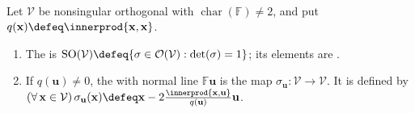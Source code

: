 \begin{definition} \label{def:orthogonal-symmetry-rotation-reflection} \\
Let $\mathcal{V}$ be nonsingular orthogonal with $\operatorname{char}(\mathbb{F})\neq2$, and put $q(\mathbf{x})\defeq\innerprod{\mathbf{x},\mathbf{x}}$.
\begin{enumerate}[label=(\roman*)]
\setlength{\itemsep}{0pt}
\item The  is $\operatorname{SO}(\mathcal{V})\defeq\{\sigma\in\mathcal{O}(\mathcal{V}):\det(\sigma)=1\}$; its elements are .
\item If $q(\mathbf{u})\neq0$, the  with normal line $\mathbb{F}\mathbf{u}$ is the map $\sigma_{\mathbf{u}}:\mathcal{V}\to\mathcal{V}$. It is defined by $(\forall\,\mathbf{x}\in\mathcal{V})\,\sigma_{\mathbf{u}}(\mathbf{x})\defeq\mathbf{x}-2\frac{\innerprod{\mathbf{x},\mathbf{u}}}{q(\mathbf{u})}\mathbf{u}$.
\end{enumerate}
\end{definition}

